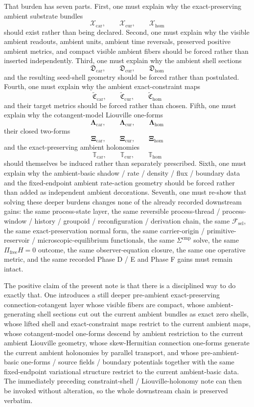\documentclass[11pt]{article}
\newcommand{\StemFunctional}{\mathscr F_{\mathrm{sel}}}
\newcommand{\TensorAmbientSpace}{\mathcal X_{\mathrm{car}}}
\newcommand{\CurAmbientSpace}{\mathcal X_{\mathrm{cur}}}
\newcommand{\HomAmbientSpace}{\mathcal X_{\mathrm{hom}}}
\newcommand{\TensorShellSection}{\mathfrak D_{\mathrm{car}}}
\newcommand{\CurShellSection}{\mathfrak D_{\mathrm{cur}}}
\newcommand{\HomShellSection}{\mathfrak D_{\mathrm{hom}}}
\newcommand{\TensorAmbientConstraintMap}{\widetilde{\mathfrak C}_{\mathrm{car}}}
\newcommand{\CurAmbientConstraintMap}{\widetilde{\mathfrak C}_{\mathrm{cur}}}
\newcommand{\HomAmbientConstraintMap}{\widetilde{\mathfrak C}_{\mathrm{hom}}}
\newcommand{\TensorAmbientLiouville}{\boldsymbol{\Lambda}_{\mathrm{car}}}
\newcommand{\CurAmbientLiouville}{\boldsymbol{\Lambda}_{\mathrm{cur}}}
\newcommand{\HomAmbientLiouville}{\boldsymbol{\Lambda}_{\mathrm{hom}}}
\newcommand{\TensorAmbientTwo}{\boldsymbol{\Xi}_{\mathrm{car}}}
\newcommand{\CurAmbientTwo}{\boldsymbol{\Xi}_{\mathrm{cur}}}
\newcommand{\HomAmbientTwo}{\boldsymbol{\Xi}_{\mathrm{hom}}}
\newcommand{\TensorAmbientTransport}{\mathbb T_{\mathrm{car}}}
\newcommand{\CurAmbientTransport}{\mathbb T_{\mathrm{cur}}}
\newcommand{\HomAmbientTransport}{\mathbb T_{\mathrm{hom}}}
\begin{document}
That burden has seven parts. First, one must explain why the exact-preserving ambient substrate bundles
\[
\TensorAmbientSpace,\qquad
\CurAmbientSpace,\qquad
\HomAmbientSpace
\]
should exist rather than being declared. Second, one must explain why the visible ambient readouts, ambient units, ambient time reversals, preserved positive ambient metrics, and compact visible ambient fibers should be forced rather than inserted independently. Third, one must explain why the ambient shell sections
\[
\TensorShellSection,\qquad
\CurShellSection,\qquad
\HomShellSection
\]
and the resulting seed-shell geometry should be forced rather than postulated. Fourth, one must explain why the ambient exact-constraint maps
\[
\TensorAmbientConstraintMap,\qquad
\CurAmbientConstraintMap,\qquad
\HomAmbientConstraintMap
\]
and their target metrics should be forced rather than chosen. Fifth, one must explain why the cotangent-model Liouville one-forms
\[
\TensorAmbientLiouville,\qquad
\CurAmbientLiouville,\qquad
\HomAmbientLiouville
\]
their closed two-forms
\[
\TensorAmbientTwo,\qquad
\CurAmbientTwo,\qquad
\HomAmbientTwo
\]
and the exact-preserving ambient holonomies
\[
\TensorAmbientTransport,\qquad
\CurAmbientTransport,\qquad
\HomAmbientTransport
\]
should themselves be induced rather than separately prescribed. Sixth, one must explain why the ambient-basic shadow / rate / density / flux / boundary data and the fixed-endpoint ambient rate-action geometry should be forced rather than added as independent ambient decorations. Seventh, one must re-show that solving these deeper burdens changes none of the already recorded downstream gains: the same process-state layer, the same reversible process-thread / process-window / history / groupoid / reconfiguration / derivation chain, the same \(\StemFunctional\), the same exact-preservation normal form, the same carrier-origin / primitive-reservoir / microscopic-equilibrium functionals, the same \(\Sigma^{\mathrm{cmp}}\) solve, the same \(\Pi_{\mathrm{free}}H=0\) outcome, the same observer-equation closure, the same one operative metric, and the same recorded Phase D / E and Phase F gains must remain intact.

The positive claim of the present note is that there is a disciplined way to do exactly that. One introduces a still deeper pre-ambient exact-preserving connection-cotangent layer whose visible fibers are compact, whose ambient-generating shell sections cut out the current ambient bundles as exact zero shells, whose lifted shell and exact-constraint maps restrict to the current ambient maps, whose cotangent-model one-forms descend by ambient restriction to the current ambient Liouville geometry, whose skew-Hermitian connection one-forms generate the current ambient holonomies by parallel transport, and whose pre-ambient-basic one-forms / source fields / boundary potentials together with the same fixed-endpoint variational structure restrict to the current ambient-basic data. The immediately preceding constraint-shell / Liouville-holonomy note can then be invoked without alteration, so the whole downstream chain is preserved verbatim.
\end{document}

